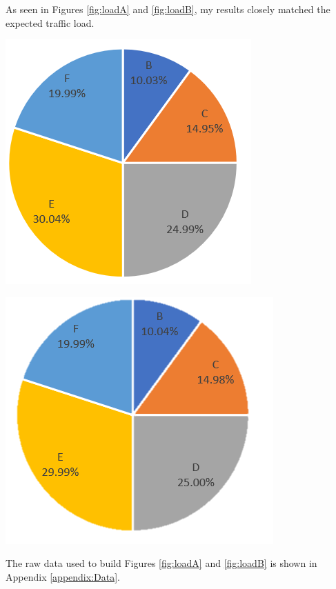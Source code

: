 \documentclass{article}
\begin{document}
As seen in Figures \ref{fig:loadA} and \ref{fig:loadB}, my results closely matched the expected traffic load.
\newline

\begin{minipage}{0.5\textwidth}
\centering
\includegraphics[scale=0.75]{Images/LoadA.PNG}
\label{fig:loadA}
\end{minipage}
\begin{minipage}{0.5\textwidth}
\centering
\includegraphics[scale=0.75]{Images/LoadB.PNG}
\label{fig:loadB}
\end{minipage}
\newline

The raw data used to build Figures \ref{fig:loadA} and \ref{fig:loadB} is shown in Appendix \ref{appendix:Data}.
\end{document}
